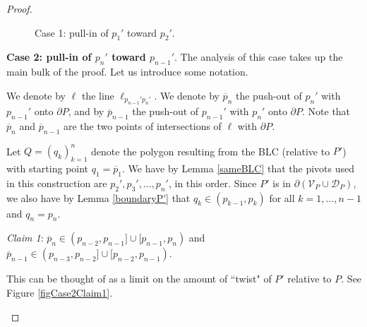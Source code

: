 \documentclass[11pt]{amsart}
\theoremstyle{remark}
\numberwithin{equation}{section}
\newcommand{\D}{\mathcal{D}}
\begin{document}
\begin{proof}
\begin{figure}[h]


\caption{Case 1: pull-in of $p_1'$ toward $p_2'$.}
\label{figCase1}
\end{figure}




\textbf{Case 2: pull-in of $p_n'$ toward $p_{n-1}'$}. The analysis of this case takes up the main bulk of the proof. Let us introduce some notation.

We denote by $\ell$ the line $\ell_{p_{n-1}'p_n'}$. We denote by $\overline p_n$ the push-out of $p_n'$ with $p_{n-1}'$ onto $\partial P$, and by $\overline p_{n-1}$ the  push-out of $p_{n-1}'$ with $p_n'$ onto $\partial P$. Note that $\overline p_n$ and $\overline p_{n-1}$ are the two points of intersections of $\ell$ with $\partial P$.

Let $Q=(q_k)_{k=1}^n$ denote the polygon resulting from the BLC (relative to $P'$) with starting point $q_1=\overline p_1$. We have by Lemma \ref{sameBLC}  that the pivots used in this construction are $p_2',p_3',\ldots,p_n'$, in this order. Since $P'$ is in $\partial(\mathcal V_P\cup\D_P)$, we also have by Lemma \ref{boundaryP'} that $q_k\in (p_{k-1},p_k)$ for all $k=1,\ldots,n-1$ and $q_n=p_n$.  


\emph{Claim 1}: $\overline p_n\in (p_{n-2} ,p_{n-1}]\cup [p_{n-1},p_n)$ and $\overline p_{n-1}\in (p_{n-3},p_{n-2}]\cup [p_{n-2},p_{n-1})$. 

This can be thought of as a limit on the amount of ``twist" of $P'$ relative to $P$. See Figure \ref{figCase2Claim1}.

\begin{figure}[h]
\centering

\end{figure}
\end{proof}
\end{document}
